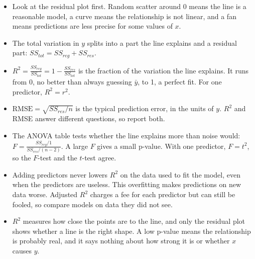 \begin{mdframed}[style=important, frametitle={Key Ideas}]
\begin{itemize}
\item Look at the residual plot first. Random scatter around 0 means the line is a reasonable model, a curve means the relationship is not linear, and a fan means predictions are less precise for some values of $x$.
\item The total variation in $y$ splits into a part the line explains and a residual part: $SS_{tot} = SS_{reg} + SS_{res}$.
\item $R^2 = \frac{SS_{reg}}{SS_{tot}} = 1 - \frac{SS_{res}}{SS_{tot}}$ is the fraction of the variation the line explains. It runs from 0, no better than always guessing $\bar{y}$, to 1, a perfect fit. For one predictor, $R^2 = r^2$.
\item $\text{RMSE} = \sqrt{SS_{res}/n}$ is the typical prediction error, in the units of $y$. $R^2$ and RMSE answer different questions, so report both.
\item The ANOVA table tests whether the line explains more than noise would: $F = \frac{SS_{reg}/1}{SS_{res}/(n - 2)}$. A large $F$ gives a small p-value. With one predictor, $F = t^2$, so the $F$-test and the $t$-test agree.
\item Adding predictors never lowers $R^2$ on the data used to fit the model, even when the predictors are useless. This overfitting makes predictions on new data worse. Adjusted $R^2$ charges a fee for each predictor but can still be fooled, so compare models on data they did not see.
\item $R^2$ measures how close the points are to the line, and only the residual plot shows whether a line is the right shape. A low p-value means the relationship is probably real, and it says nothing about how strong it is or whether $x$ causes $y$.
\end{itemize}
\end{mdframed}
